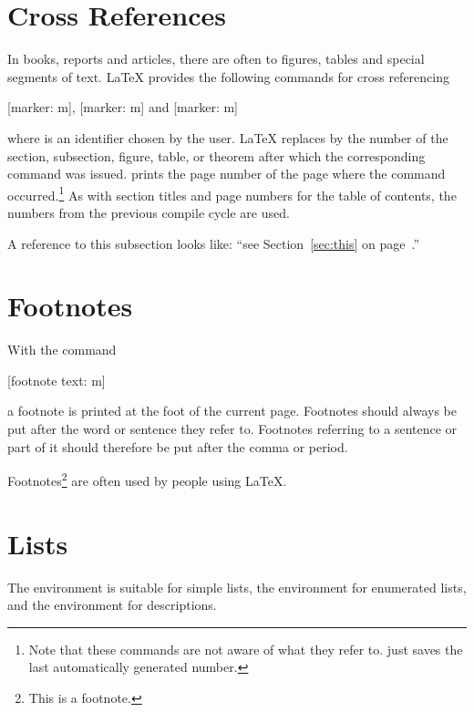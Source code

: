 \section{Cross References}

In books, reports and articles, there are often
 to figures, tables and special segments of text.
\LaTeX{} provides the following commands for cross referencing
\begin{lscommand}
  [marker: m], [marker: m]
  and [marker: m]
\end{lscommand}
where  is an identifier chosen by the user. \LaTeX{} replaces
 by the number of the section, subsection, figure, table, or theorem
after which the corresponding  command was issued. 
prints the page number of the page where the  command
occurred.\footnote{Note that these commands are not aware of what they refer
  to.  just saves the last automatically generated number.} As with
section titles and page numbers for the table of contents, the numbers from the
previous compile cycle are used.

\begin{example}[examplewidth=0.4\textwidth]
A reference to this subsection%
\label{sec:this} looks like:
\enquote{see Section~\ref{sec:this}
on page~\pageref{sec:this}.}
\end{example}

\section{Footnotes}
With the command
\begin{lscommand}
  [footnote text: m]
\end{lscommand}
a footnote is printed at the foot of the current page.  Footnotes should always
be put after the word or sentence they refer to. Footnotes referring to a
sentence or part of it should therefore be put after the comma or period.

\begin{example}
Footnotes\footnote{This is
  a footnote.} are often used
by people using \LaTeX.
\end{example}

\section{Lists}

The  environment is suitable for simple lists, the
 environment for enumerated lists, and the
 environment for descriptions.

